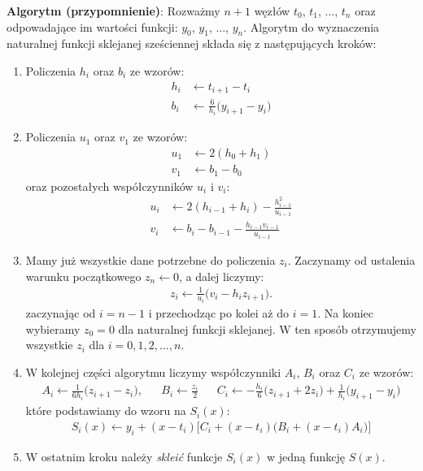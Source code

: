 \documentclass[12pt]{report}
\begin{document}
\vspace{2mm}
\noindent
{\bf Algorytm (przypomnienie)}: Rozwa\.zmy $n+1$ w\k{e}z\l{}\'ow $t_0$, $t_1$, ..., $t_n$ oraz odpowadaj\k{a}ce im warto\'sci funkcji: $y_0$, $y_1$, ..., $y_n$. Algorytm do wyznaczenia naturalnej funkcji sklejanej sze\'sciennej sk\l{}ada si\k{e} z nast\k{e}puj\k{a}cych krok\'ow:
\begin{enumerate}
\item Policzenia $h_i$ oraz $b_i$ ze wzor\'ow:
\begin{align}
h_i &\leftarrow t_{i+1}-t_i\nonumber\\
b_i &\leftarrow \frac{6}{h_i}\bigg(y_{i+1}-y_i\bigg) \nonumber
\end{align}
\item Policzenia $u_1$ oraz $v_1$ ze wzor\'ow:
\begin{align}
u_1 &\leftarrow 2(h_0+h_1)\nonumber\\
v_1 &\leftarrow b_1-b_0 \nonumber
\end{align}
oraz pozosta\l{}ych wsp\'o\l{}czynnik\'ow $u_i$ i $v_i$:
\begin{align}
u_i &\leftarrow 2(h_{i-1}+h_i)- \frac{h_{i-1}^2}{u_{i-1}}\nonumber\\
v_i &\leftarrow b_i - b_{i-1} - \frac{h_{i-1} v_{i-1}}{u_{i-1}}\nonumber
\end{align}
\item Mamy ju\.z wszystkie dane potrzebne do policzenia $z_i$. Zaczynamy od ustalenia warunku pocz\k{a}tkowego $z_n\leftarrow 0$, a dalej liczymy:
\begin{align}
z_i \leftarrow \frac{1}{u_i} \bigg( v_i - h_i z_{i+1} \bigg).\nonumber
\end{align}
zaczynaj\k{a}c od $i=n-1$ i przechodz\k{a}c po kolei a\.z do $i=1$. Na koniec wybieramy $z_0=0$ dla naturalnej funkcji sklejanej. W ten spos\'ob otrzymujemy wszystkie $z_i$ dla $i=0,1,2,...,n$.
\item W kolejnej cz\k{e}\'sci algorytmu liczymy wsp\'o\l{}czynniki $A_i$, $B_i$ oraz $C_i$ ze wzor\'ow:
\begin{align}
A_i \leftarrow \frac{1}{6h_i}\Big( z_{i+1}-z_i\Big), && B_i \leftarrow \frac{z_i}{2} && C_i \leftarrow -\frac{h_i}{6}\Big(z_{i+1}+2z_i \Big)+\frac{1}{h_i} \Big(y_{i+1}-y_i\Big) \nonumber
\end{align}
kt\'ore podstawiamy do wzoru na $S_i(x)$:
\begin{align}
S_i(x) \leftarrow y_i + (x-t_i)\Big[ C_i +(x-t_i)\big(B_i+(x-t_i)A_i\big)\Big]\nonumber
\end{align}
\item W ostatnim kroku nale\.zy {\it sklei\'c} funkcje $S_i(x)$ w jedn\k{a} funkcj\k{e} $S(x)$.
\end{enumerate} 
\end{document}
